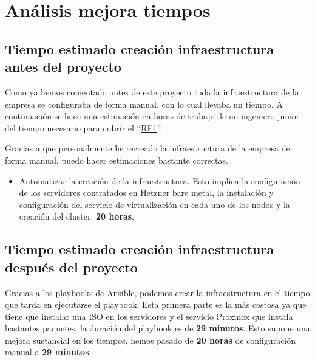 \section{Análisis mejora tiempos}
\label{analisis_tiempos} 
\subsection{Tiempo estimado creación infraestructura antes del proyecto}
\begin{text}
        Como ya hemos comentado antes de este proyecto toda la infraestructura de la empresa se configuraba de forma manual, con lo cual llevaba un tiempo. A continuación se hace una estimación en horas de trabajo de un ingeniero junior del tiempo necesario para cubrir el ``\hyperref[RF1]{RF1}''.

        Gracias a que personalmente he recreado la infraestructura de la empresa de forma manual, puedo hacer estimaciones bastante correctas.

        \begin{itemize}
                \item Automatizar la creación de la infraestructura. Esto implica la configuración de los servidores contratados en Hetzner bare metal, la instalación y configuración del servicio de virtualización en cada uno de los nodos y la creación del cluster.  \textbf{20 horas}.
        \end{itemize}

\end{text}

\subsection{Tiempo estimado creación infraestructura después del proyecto}
\begin{text}
        Gracias a los playbooks de Ansible, podemos crear la infraestructura en el tiempo que tarda en ejecutarse el playbook. Esta primera parte es la más costosa ya que tiene que instalar una ISO en los servidores y el servicio Proxmox que instala bastantes paquetes, la duración del playbook es de \textbf{29 minutos}. Esto supone una mejora sustancial en los tiempos, hemos pasado de \textbf{20 horas} de configuración manual a \textbf{29 minutos}.
\end{text}

